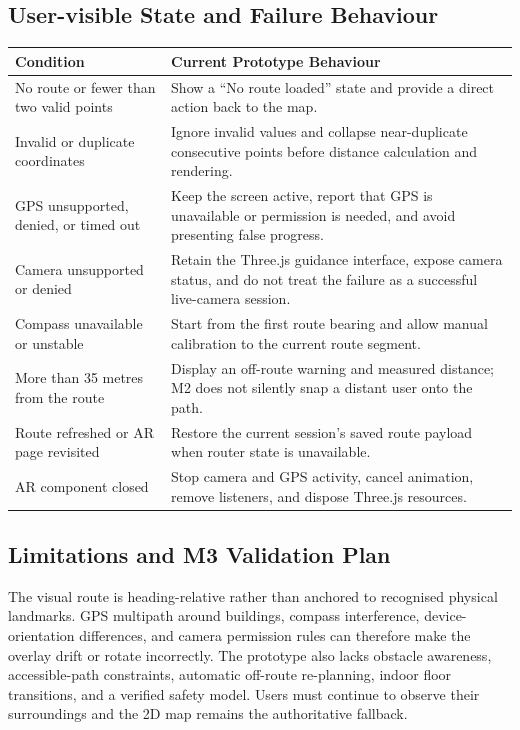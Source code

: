 \documentclass[11pt]{article}
\begin{document}
\subsection*{User-visible State and Failure Behaviour}

\begin{center}
\renewcommand{\arraystretch}{1.3}
\begin{tabularx}{\textwidth}{|L{0.28\textwidth}|X|}
\hline
\textbf{Condition} & \textbf{Current Prototype Behaviour} \\
\hline
No route or fewer than two valid points & Show a ``No route loaded'' state and provide a direct action back to the map. \\
\hline
Invalid or duplicate coordinates & Ignore invalid values and collapse near-duplicate consecutive points before distance calculation and rendering. \\
\hline
GPS unsupported, denied, or timed out & Keep the screen active, report that GPS is unavailable or permission is needed, and avoid presenting false progress. \\
\hline
Camera unsupported or denied & Retain the Three.js guidance interface, expose camera status, and do not treat the failure as a successful live-camera session. \\
\hline
Compass unavailable or unstable & Start from the first route bearing and allow manual calibration to the current route segment. \\
\hline
More than 35 metres from the route & Display an off-route warning and measured distance; M2 does not silently snap a distant user onto the path. \\
\hline
Route refreshed or AR page revisited & Restore the current session's saved route payload when router state is unavailable. \\
\hline
AR component closed & Stop camera and GPS activity, cancel animation, remove listeners, and dispose Three.js resources. \\
\hline
\end{tabularx}
\end{center}

\subsection*{Limitations and M3 Validation Plan}

The visual route is heading-relative rather than anchored to recognised physical landmarks. GPS multipath around buildings, compass interference, device-orientation differences, and camera permission rules can therefore make the overlay drift or rotate incorrectly. The prototype also lacks obstacle awareness, accessible-path constraints, automatic off-route re-planning, indoor floor transitions, and a verified safety model. Users must continue to observe their surroundings and the 2D map remains the authoritative fallback.
\end{document}
